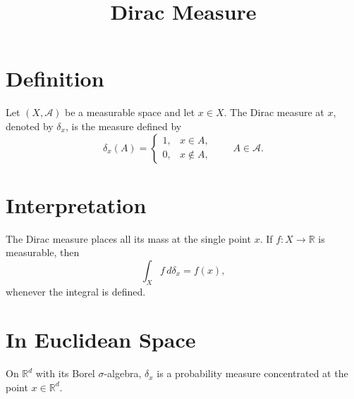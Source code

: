 \documentclass[11pt]{article}
\title{Dirac Measure}
\author{}
\date{}
\begin{document}
\maketitle

\section*{Definition}

Let $(X,\mathcal A)$ be a measurable space and let $x\in X$. The Dirac measure
at $x$, denoted by $\delta_x$, is the measure defined by
\[
\delta_x(A)
=
\begin{cases}
1, & x\in A,\\
0, & x\notin A,
\end{cases}
\qquad A\in\mathcal A.
\]

\section*{Interpretation}

The Dirac measure places all its mass at the single point $x$. If $f:X\to\mathbb R$
is measurable, then
\[
\int_X f\,d\delta_x = f(x),
\]
whenever the integral is defined.

\section*{In Euclidean Space}

On $\mathbb R^d$ with its Borel $\sigma$-algebra, $\delta_x$ is a probability
measure concentrated at the point $x\in\mathbb R^d$.
\end{document}
